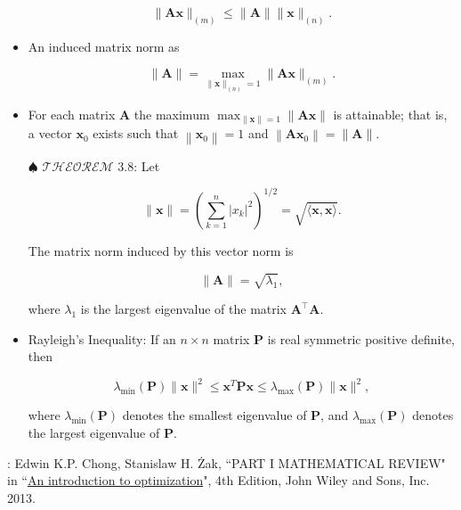 \documentclass[12pt,thmsa]{article}
\begin{document}
\begin{itemize}
	\begin{equation*}
		\|\boldsymbol{A} \boldsymbol{x}\|_{(m)} \leq\|\boldsymbol{A}\|\|\boldsymbol{x}\|_{(n)}.
	\end{equation*}

	\item An induced matrix norm as
	
	\begin{equation*}
		\|\boldsymbol{A}\|=\max _{\|\boldsymbol{x}\|_{(n)}=1}\|\boldsymbol{A} \boldsymbol{x}\|_{(m)}.
	\end{equation*}

	\item For each matrix \(\boldsymbol{A}\) the maximum \(\max _{\|\boldsymbol{x}\|=1}\|\boldsymbol{A} \boldsymbol{x}\|\) is attainable; that is, a vector \(\boldsymbol{x}_{0}\) exists such that \(\left\|\boldsymbol{x}_{0}\right\|=1\) and \(\left\|\boldsymbol{A} \boldsymbol{x}_{0}\right\|=\|\boldsymbol{A}\|\).
	
	\item[\(\spadesuit\)] \(\mathscr{THEOREM}\) 3.8: Let
	
	\begin{equation*}
		\|\boldsymbol{x}\|=\left(\sum_{k=1}^{n}\left|x_{k}\right|^{2}\right)^{1 / 2}=\sqrt{\langle\boldsymbol{x}, \boldsymbol{x}\rangle}.
	\end{equation*}
	
	The matrix norm induced by this vector norm is
	
	\begin{equation*}
		\|\boldsymbol{A}\|=\sqrt{\lambda_{1}},
	\end{equation*}
	
	where \(\lambda_{1}\) is the largest eigenvalue of the matrix \(\boldsymbol{A}^{\top} \boldsymbol{A}\).
	
	\item Rayleigh's Inequality: If an \(n \times n\) matrix \(\boldsymbol{P}\) is real symmetric positive definite, then
	
	\begin{equation*}
		\lambda_{\min }(\boldsymbol{P})\|\boldsymbol{x}\|^{2} \leq \boldsymbol{x}^{T} \boldsymbol{P} \boldsymbol{x} \leq \lambda_{\max }(\boldsymbol{P})\|\boldsymbol{x}\|^{2},
	\end{equation*}
	
	where \(\lambda_{\min }(\boldsymbol{P})\) denotes the smallest eigenvalue of \(\boldsymbol{P}\), and \(\lambda_{\max }(\boldsymbol{P})\) denotes the largest eigenvalue of \(\boldsymbol{P}\). 
	
\end{itemize}

\medskip

\noindent
[Ref]: Edwin K.P. Chong, Stanislaw H. Żak, ``PART I MATHEMATICAL REVIEW" in ``\href{https://www.amazon.com/Introduction-Optimization-Edwin-K-Chong/dp/1118279018}{An introduction to optimization}", 4th Edition, John Wiley and Sons, Inc. 2013.
\end{document}
